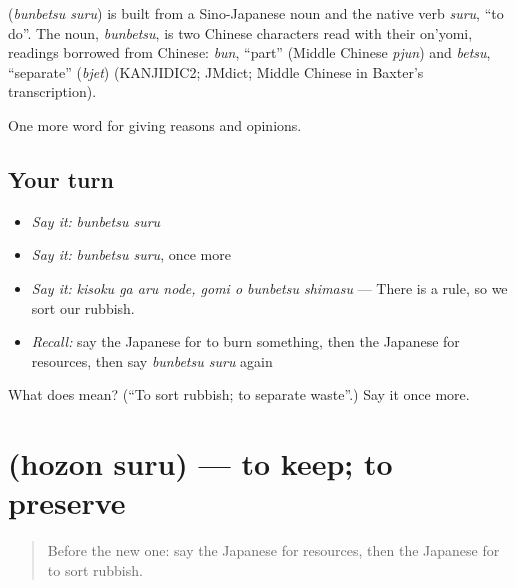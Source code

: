 \begin{cousinweb}
\textbf{} (\emph{bunbetsu suru}) is built from a Sino-Japanese noun and the native verb \emph{suru}, \textquotedblleft{}to do\textquotedblright{}. The noun, \emph{bunbetsu}, is two Chinese characters read with their on'yomi, readings borrowed from Chinese: \emph{bun}, \textquotedblleft{}part\textquotedblright{} (Middle Chinese \emph{pjun}) and \emph{betsu}, \textquotedblleft{}separate\textquotedblright{} (\emph{bjet}) (KANJIDIC2; JMdict; Middle Chinese in Baxter's transcription).
\end{cousinweb}

\begin{grammarlens}[title={What you've built}]
One more word for giving reasons and opinions.
\end{grammarlens}

\subsection*{Your turn}
\begin{itemize}
\raggedright
  \item \emph{Say it:} \emph{bunbetsu suru}
  \item \emph{Say it:} \emph{bunbetsu suru}, once more
  \item \emph{Say it:} \emph{kisoku ga aru node, gomi o bunbetsu shimasu} — There is a rule, so we sort our rubbish.
  \item \emph{Recall:} say the Japanese for to burn something, then the Japanese for resources, then say \emph{bunbetsu suru} again
\end{itemize}

\begin{tcolorbox}[breakable,colback=teal!4,colframe=teal!35!black,title={Before you move on}]
What does  mean? (\textquotedblleft{}To sort rubbish; to separate waste\textquotedblright{}.) Say it once more.
\end{tcolorbox}
\section[\texorpdfstring{\ja{ほぞんする} (hozon suru)}{ほぞんする (hozon suru)}]{ (hozon suru) — to keep; to preserve}

\label{lesson:JA-C339-hozon-suru}



\begin{quote}
Before the new one: say the Japanese for resources, then the Japanese for to sort rubbish.
\end{quote}

